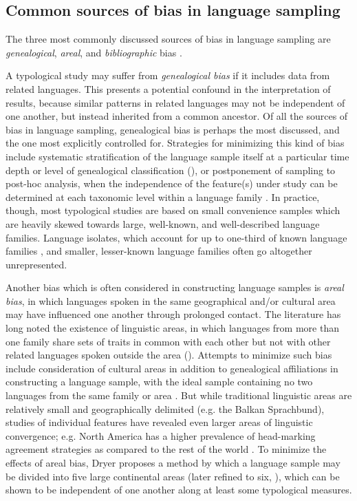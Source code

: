 \subsection{Common sources of bias in language sampling}\label{sec:2.1.1}

  The three most commonly discussed sources of bias in language sampling are \textit{genealogical}, \textit{areal}, and \textit{bibliographic} bias \citep{Bakker2011}. 

  A typological study may suffer from \textit{genealogical bias} if it includes data from related languages. This presents a potential confound in the interpretation of results, because similar patterns in related languages may not be independent of one another, but instead inherited from a common ancestor. Of all the sources of bias in language sampling, genealogical bias is perhaps the most discussed, and the one most explicitly controlled for. Strategies for minimizing this kind of bias include systematic stratification of the language sample itself at a particular time depth or level of genealogical classification (\citealt{Bell1978b,Maddieson1984,Dryer1989}), or postponement of sampling to post-hoc analysis, when the independence of the feature(s) under study can be determined at each taxonomic level within a language family \citep{Bickel2008}. In practice, though, most typological studies are based on small convenience samples which are heavily skewed towards large, well-known, and well-described language families. Language isolates, which account for up to one-third of known language families \citep{Campbell2016}, and smaller, lesser-known language families often go altogether unrepresented.

  Another bias which is often considered in constructing language samples is \textit{areal bias}, in which languages spoken in the same geographical and/or cultural area may have influenced one another through prolonged contact. The literature has long noted the existence of linguistic areas, in which languages from more than one family share sets of traits in common with each other but not with other related languages spoken outside the area (\citealt{AikhenvaldDixon2001a,Chirikba2008}). Attempts to minimize such bias include consideration of cultural areas in addition to genealogical affiliations in constructing a language sample, with the ideal sample containing no two languages from the same family or area \citep{Perkins1985}. But while traditional linguistic areas are relatively small and geographically delimited (e.g. the Balkan Sprachbund), studies of individual features have revealed even larger areas of linguistic convergence; e.g. North America has a higher prevalence of head-marking agreement strategies as compared to the rest of the world \citep{Dryer1989}. To minimize the effects of areal bias, Dryer proposes a method by which a language sample may be divided into five large continental areas (later refined to six, \citealt{Dryer1992}), which can be shown to be independent of one another along at least some typological measures.

